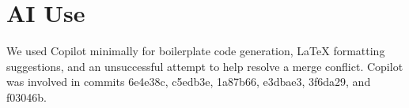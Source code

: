 \newpage
\section{AI Use}

We used Copilot minimally for boilerplate code generation, LaTeX formatting suggestions, and an unsuccessful attempt to help resolve a merge conflict. Copilot was involved in commits 6e4e38c, c5edb3e, 1a87b66, e3dbae3, 3f6da29, and f03046b.
